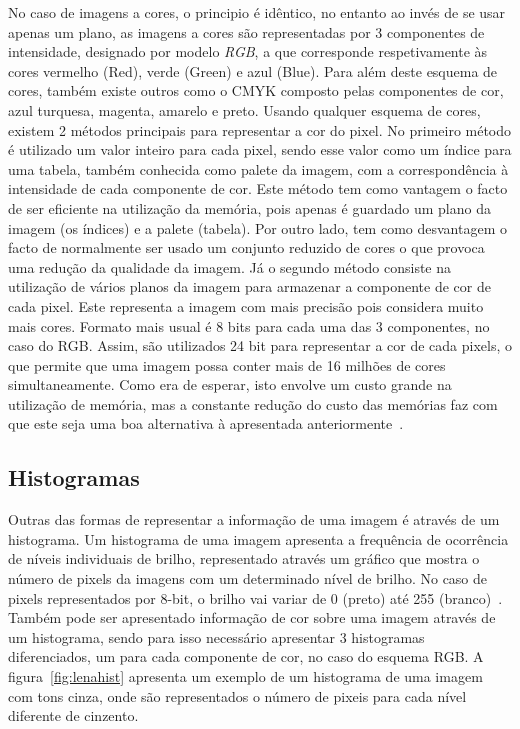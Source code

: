 No caso de imagens a cores, o principio é idêntico, no entanto ao invés de se usar apenas um plano, as imagens a cores são representadas por 3 componentes de intensidade, designado por modelo \textit{RGB}, a que corresponde respetivamente às cores vermelho (Red), verde (Green) e azul (Blue). Para além deste esquema de cores, também existe outros como o CMYK composto pelas componentes de cor, azul turquesa, magenta, amarelo e preto. Usando qualquer esquema de cores, existem 2 métodos principais para representar a cor do pixel. No primeiro método é utilizado um valor inteiro para cada pixel, sendo esse valor como um índice para uma tabela, também conhecida como palete da imagem, com a correspondência à intensidade de cada componente de cor. Este método tem como vantagem o facto de ser eficiente na utilização da memória, pois apenas é guardado um plano da imagem (os índices) e a palete (tabela). Por outro lado, tem como desvantagem o facto de normalmente ser usado um conjunto reduzido de cores o que provoca uma redução da qualidade da imagem. Já o segundo método consiste na utilização de vários planos da imagem para armazenar a componente de cor de cada pixel. Este representa a imagem com mais precisão pois considera muito mais cores.  Formato mais usual é 8 bits para cada uma das 3 componentes, no caso do RGB. Assim, são utilizados 24 bit para representar a cor de cada pixels, o que permite que uma imagem possa conter mais de 16 milhões de cores simultaneamente. Como era de esperar, isto envolve um custo grande na utilização de memória, mas a constante redução do custo das memórias faz com que este seja uma boa alternativa à apresentada anteriormente~\citet{Nixon2002}.

\subsection{Histogramas} \label{subsec:hist}

Outras das formas de representar a informação de uma imagem é através de um histograma. Um histograma de uma imagem apresenta a frequência de ocorrência de níveis individuais de brilho, representado através um gráfico que mostra o número de pixels da imagens com um determinado nível de brilho. No caso de pixels representados por 8-bit, o brilho vai variar de 0 (preto) até 255 (branco)~\citet{Nixon2002}. Também pode ser apresentado informação de cor sobre uma imagem através de um histograma, sendo para isso necessário apresentar 3 histogramas diferenciados, um para cada componente de cor, no caso do esquema RGB.
A figura~\ref{fig:lenahist} apresenta um exemplo de um histograma de uma imagem com tons cinza, onde são representados o número de pixeis para cada nível diferente de cinzento.

